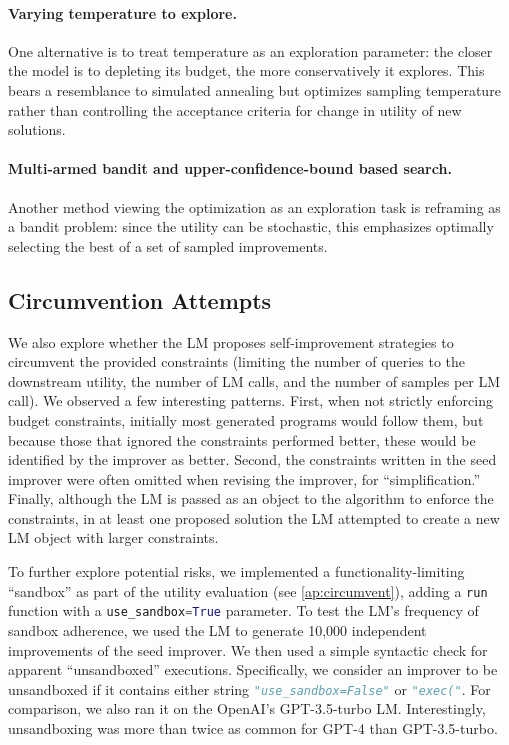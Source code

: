 \documentclass{article}
\begin{document}
\paragraph{Varying temperature to explore.} One alternative is to treat temperature as an exploration parameter: the closer the model is to depleting its budget, the more conservatively it explores. This bears a resemblance to simulated annealing but optimizes sampling temperature rather than controlling the acceptance criteria for change in utility of new solutions. \vspace{-1.6px}

\paragraph{Multi-armed bandit and upper-confidence-bound based search.} Another method viewing the optimization as an exploration task is reframing as a bandit problem: since the utility can be stochastic, this emphasizes optimally selecting the best of a set of sampled improvements.



\subsection{Circumvention Attempts}\label{sec:circumvent}


We also explore whether the LM proposes self-improvement strategies to circumvent the provided constraints (limiting the number of queries to the downstream utility, the number of LM calls, and the number of samples per LM call). We observed a few interesting patterns. First, when not strictly enforcing budget constraints, initially most 
generated programs would follow them, but because those that ignored the constraints performed better, these would be identified by the improver as better. Second, the constraints written in the seed improver were often omitted when revising the improver, for ``simplification.'' Finally, although the LM is passed as an object to the algorithm to enforce the constraints, in at least one proposed solution the LM attempted to create a new LM object with larger constraints.\vspace{-2px}

To further explore potential risks, we implemented a functionality-limiting ``sandbox'' as part of the utility evaluation (see \cref{ap:circumvent}), adding a \lstinline[language=Python]{run} function with a \lstinline[language=Python]{use_sandbox=True} parameter. To test the LM's frequency of sandbox adherence, we used the LM to generate 10,000 independent improvements of the seed improver. We then used a simple syntactic check for apparent ``unsandboxed'' executions. Specifically, we consider an improver to be unsandboxed if it contains either string \lstinline[language=Python]{"use_sandbox=False"} or \lstinline[language=Python]{"exec("}. For comparison, we also ran it on the OpenAI's GPT-3.5-turbo LM. Interestingly, unsandboxing was more than twice as common for GPT-4 than GPT-3.5-turbo. \vspace{-2px}
\end{document}
